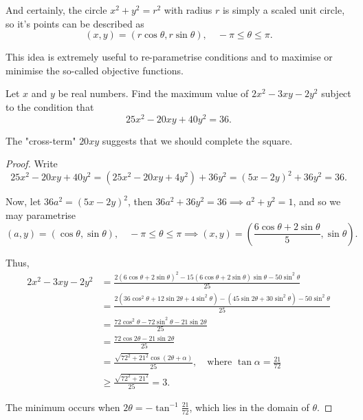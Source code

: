 \documentclass[../main.tex]{subfiles}
\begin{document}
And certainly, the circle $x^2+y^2=r^2$ with radius $r$ is simply a scaled unit circle, so it's points can be described as
$$(x,y)=(r\cos\theta, r\sin\theta), \quad -\pi\leq\theta\leq\pi.$$

This idea is extremely useful to re-parametrise conditions and to maximise or minimise the so-called objective functions.
\begin{example}[2018 SMO(S) P11]
    Let $x$ and $y$ be real numbers. Find the maximum value of $2x^2-3xy-2y^2$ subject to the condition that
    $$25x^2-20xy+40y^2=36.$$
\end{example}
The "cross-term" $20xy$ suggests that we should complete the square. 


\begin{proof}
    Write $$25x^2-20xy+40y^2=(25x^2-20xy+4y^2)+36y^2=(5x-2y)^2+36y^2=36.$$
    
    Now, let $36a^2=(5x-2y)^2$, then $36a^2+36y^2=36 \implies a^2+y^2=1$, and so we may parametrise 
    $$(a,y)=(\cos\theta,\sin\theta),\quad -\pi\leq\theta\leq\pi \implies (x,y)=\left(\frac{6\cos\theta+2\sin\theta}{5}, \sin\theta\right).$$
    
    Thus, \begin{align*}
        2x^2-3xy-2y^2&=\frac{2(6\cos\theta+2\sin\theta)^2-15(6\cos\theta+2\sin\theta)\sin\theta-50\sin^2\theta}{25} \\
        &=\frac{2(36\cos^2\theta+12\sin 2\theta+4\sin^2\theta)-(45\sin2\theta+30\sin^2\theta)-50\sin^2\theta}{25} \\
        &=\frac{72\cos^2\theta-72\sin^2\theta-21\sin2\theta}{25} \\
        &=\frac{72\cos2\theta-21\sin2\theta}{25} \\
        &=\frac{\sqrt{72^2+21^2}\cos(2\theta+\alpha)}{25}, \quad \text{where }\tan\alpha=\frac{21}{72} \\
        &\geq\frac{\sqrt{72^2+21^2}}{25}=\boxed{3}.
    \end{align*}
    
    The minimum occurs when $2\theta=-\tan^{-1}\frac{21}{72}$, which lies in the domain of $\theta$.
\end{proof}
\end{document}
